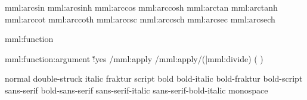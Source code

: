 \startxmlsetups  mml:arcsin   \stopxmlsetups
\startxmlsetups  mml:arcsinh  \stopxmlsetups
\startxmlsetups  mml:arccos   \stopxmlsetups
\startxmlsetups  mml:arccosh  \stopxmlsetups
\startxmlsetups  mml:arctan   \stopxmlsetups
\startxmlsetups  mml:arctanh  \stopxmlsetups
\startxmlsetups  mml:arccot   \stopxmlsetups
\startxmlsetups  mml:arccoth  \stopxmlsetups
\startxmlsetups  mml:arccsc   \stopxmlsetups
\startxmlsetups  mml:arccsch  \stopxmlsetups
\startxmlsetups  mml:arcsec   \stopxmlsetups
\startxmlsetups  mml:arcsech  \stopxmlsetups

\startxmlsetups mml:function
    \ifempty\MMLpowerelement
        \ifconditional\xmlinversefunction{}\fi
        \setfalse\xmlinversefunction
    \else
        \normalsuperscript{\ifconditional\xmlinversefunction-\fi\MMLpowerelement}
        \setfalse\xmlinversefunction
        \glet\MMLpowerelement\empty
    \fi
\stopxmlsetups

\startxmlsetups mml:function:argument
    \doifelse \MMLfunctionreduction \v!yes {
         {/mml:apply} {
             {/mml:apply/(\MMLcfunctionlist\string|mml:divide)}
                \donefalse
                \donetrue
        } {
            \donefalse
        }
    } {
        \donetrue
    }
    \ifdone
        \left(
            \MMLcreset
        \right)
    \else
        \MMLcreset
    \fi
\stopxmlsetups



 {normal}                 {\mathupright} %
 {double-struck}          {\mathblackboard}
 {italic}                 {\mathit}
 {fraktur}                {\mathfraktur}
 {script}                 {\mathscript}
 {bold}                   {\mb}          %
 {bold-italic}            {\mathbi}
 {bold-fraktur}           {\mathfraktur\mathbf}
 {bold-script}            {\mathscript\mathbf}
 {sans-serif}             {\mathss}
 {bold-sans-serif}        {\mathss\mathbf}
 {sans-serif-italic}      {\mathss\mathit}
 {sans-serif-bold-italic} {\mathss\mathbi}
 {monospace}              {\mathtt}

